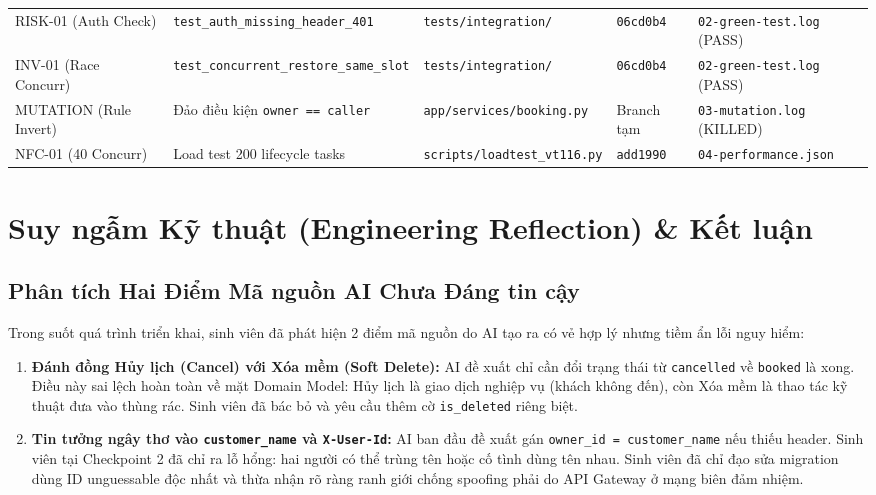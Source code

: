 \documentclass[10pt,a4paper]{article}
\newcommand{\codepath}[1]{{\ttfamily\scriptsize\nolinkurl{#1}}}
\begin{document}
\begin{tabularx}{\linewidth}{@{}P{1.8cm}P{3.2cm}P{3.0cm}P{1.6cm}Y@{}}
RISK-01 (Auth Check) & \texttt{test\_auth\_missing\_header\_401} & \codepath{tests/integration/} & \texttt{06cd0b4} & \codepath{02-green-test.log} (PASS) \\
INV-01 (Race Concurr) & \texttt{test\_concurrent\_restore\_same\_slot} & \codepath{tests/integration/} & \texttt{06cd0b4} & \codepath{02-green-test.log} (PASS) \\
MUTATION (Rule Invert) & Đảo điều kiện \texttt{owner == caller} & \codepath{app/services/booking.py} & Branch tạm & \codepath{03-mutation.log} (KILLED) \\
NFC-01 (40 Concurr) & Load test 200 lifecycle tasks & \codepath{scripts/loadtest_vt116.py} & \texttt{add1990} & \codepath{04-performance.json} \\
\bottomrule
\end{tabularx}

\clearpage
\section{Suy ngẫm Kỹ thuật (Engineering Reflection) \& Kết luận}

\subsection{Phân tích Hai Điểm Mã nguồn AI Chưa Đáng tin cậy}
Trong suốt quá trình triển khai, sinh viên đã phát hiện 2 điểm mã nguồn do AI tạo ra có vẻ hợp lý nhưng tiềm ẩn lỗi nguy hiểm:
\begin{enumerate}[leftmargin=1.1em,itemsep=0.3pt]
  \item \textbf{Đánh đồng Hủy lịch (Cancel) với Xóa mềm (Soft Delete):} AI đề xuất chỉ cần đổi trạng thái từ \texttt{cancelled} về \texttt{booked} là xong. Điều này sai lệch hoàn toàn về mặt Domain Model: Hủy lịch là giao dịch nghiệp vụ (khách không đến), còn Xóa mềm là thao tác kỹ thuật đưa vào thùng rác. Sinh viên đã bác bỏ và yêu cầu thêm cờ \texttt{is\_deleted} riêng biệt.
  \item \textbf{Tin tưởng ngây thơ vào \texttt{customer\_name} và \texttt{X-User-Id}:} AI ban đầu đề xuất gán \texttt{owner\_id = customer\_name} nếu thiếu header. Sinh viên tại Checkpoint 2 đã chỉ ra lỗ hổng: hai người có thể trùng tên hoặc cố tình dùng tên nhau. Sinh viên đã chỉ đạo sửa migration dùng ID unguessable độc nhất và thừa nhận rõ ràng ranh giới chống spoofing phải do API Gateway ở mạng biên đảm nhiệm.
\end{enumerate}
\end{document}
